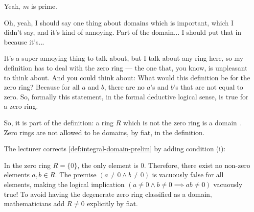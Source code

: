 \begin{speech}[00:16:05 - 00:17:09]
Yeah, $m$ is prime. 

Oh, yeah, I should say one thing about domains which is important, which I didn't say, and it's kind of annoying. Part of the domain... I should put that in because it's... 

It's a super annoying thing to talk about, but I talk about any ring here, so my definition has to deal with the zero ring --- the one that, you know, is unpleasant to think about. And you could think about: What would this definition be for the zero ring? Because for all $a$ and $b$, there are no $a$'s and $b$'s that are not equal to zero. So, formally this statement, in the formal deductive logical sense, is true for a zero ring.

So, it is part of the definition: a ring $R$ which is not the zero ring is a domain . Zero rings are not allowed to be domains, by fiat, in the definition. 
\end{speech}

\begin{content}
The lecturer corrects \cref{def:integral-domain-prelim} by adding condition (i):


\begin{steps}
In the zero ring $R = \{0\}$, the only element is $0$. Therefore, there exist no non-zero elements $a, b \in R$. The premise $(a \neq 0 \land b \neq 0)$ is vacuously false for all elements, making the logical implication $(a \neq 0 \land b \neq 0 \implies ab \neq 0)$ vacuously true! To avoid having the degenerate zero ring classified as a domain, mathematicians add $R \neq 0$ explicitly by fiat.
\end{steps}
\end{content}

